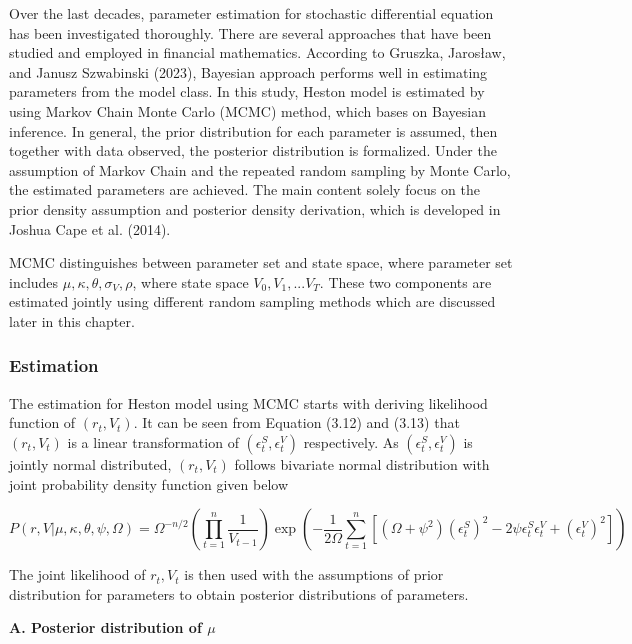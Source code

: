 \documentclass[12pt,a4paper]{article}
\numberwithin{equation}{section}
\begin{document}
Over the last decades, parameter estimation for stochastic differential equation has been investigated thoroughly. There are several approaches that have been studied and employed in financial mathematics. According to Gruszka, Jarosław, and Janusz Szwabinski (2023), Bayesian approach performs well in estimating parameters from the model class. In this study, Heston model is estimated by using Markov Chain Monte Carlo (MCMC) method, which bases on Bayesian inference. In general, the prior distribution for each parameter is assumed, then together with data observed, the posterior distribution is formalized. Under the assumption of Markov Chain and the repeated random sampling by Monte Carlo, the estimated parameters are achieved. The main content solely focus on the prior density assumption and posterior density derivation, which is developed in Joshua Cape et al. (2014).

MCMC distinguishes between parameter set and state space, where parameter set includes $\mu, \kappa, \theta, \sigma_V, \rho$, where state space ${V_0, V_1, ...V_T}$. These two components are estimated jointly using different random sampling methods which are discussed later in this chapter.

\subsubsection{Estimation}
The estimation for Heston model using MCMC starts with deriving likelihood function of $(r_t, V_t)$. It can be seen from Equation (3.12) and (3.13) that $(r_t, V_t)$ is a linear transformation of $(\epsilon_t^S, \epsilon_t^V)$ respectively. As $(\epsilon_t^S, \epsilon_t^V)$ is jointly normal distributed, $(r_t, V_t)$ follows bivariate normal distribution with joint probability density function given below

\[
P(r, V| \mu, \kappa, \theta, \psi, \Omega) = \Omega^{-n/2} \left( \prod_{t=1}^{n} \frac{1}{V_{t-1}}\right) \exp \left(- \frac{1}{2\Omega} \sum_{t=1}^{n} [(\Omega + \psi^2)(\epsilon_t^S)^2 - 2 \psi \epsilon_t^S \epsilon_t^V + (\epsilon_t^V)^2]\right) \label{eq:3.13}
\]

The joint likelihood of $r_t, V_t$ is then used with the assumptions of prior distribution for parameters to obtain posterior distributions of parameters.

\vspace{1em}

\textbf{A. Posterior distribution of $\mu$}

\vspace{1em}
\end{document}
